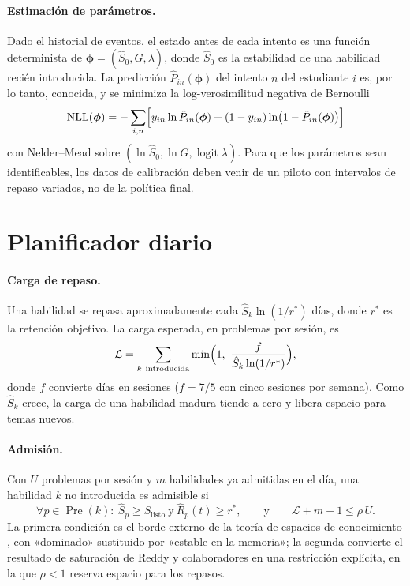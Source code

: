 \documentclass[runningheads]{llncs}
\newcommand{\Pre}{\operatorname{Pre}}
\newcommand{\Rh}{\hat R}
\newcommand{\Sh}{\hat S}
\newcommand{\rstar}{r^{\ast}}
\newcommand{\Slisto}{S_{\mathrm{listo}}}
\newcommand{\Carga}{\mathcal L}
\begin{document}
\paragraph{Estimación de parámetros.} Dado el historial de eventos, el estado antes de cada intento es una función determinista de $\bm\phi=(\Sh_0,G,\lambda)$, donde $\Sh_0$ es la estabilidad de una habilidad recién introducida. La predicción $\hat P_{in}(\bm\phi)$ del intento $n$ del estudiante $i$ es, por lo tanto, conocida, y se minimiza la log-verosimilitud negativa de Bernoulli
\begin{equation}
\mathrm{NLL}(\bm\phi)=-\sum_{i,n}\Bigl[y_{in}\ln\hat P_{in}(\bm\phi)+(1-y_{in})\ln\bigl(1-\hat P_{in}(\bm\phi)\bigr)\Bigr]
\label{eq:nll}
\end{equation}
con Nelder--Mead sobre $(\ln\Sh_0,\ln G,\operatorname{logit}\lambda)$. Para que los parámetros sean identificables, los datos de calibración deben venir de un piloto con intervalos de repaso variados, no de la política final.

\section{Planificador diario}
\label{sec:planificador}

\paragraph{Carga de repaso.} Una habilidad se repasa aproximadamente cada $\Sh_k\ln(1/\rstar)$ días, donde $\rstar$ es la retención objetivo. La carga esperada, en problemas por sesión, es
\begin{equation}
\Carga=\sum_{k\ \text{introducida}}\min\Bigl(1,\ \frac{f}{\Sh_k\ln(1/\rstar)}\Bigr),
\label{eq:carga}
\end{equation}
donde $f$ convierte días en sesiones ($f=7/5$ con cinco sesiones por semana). Como $\Sh_k$ crece, la carga de una habilidad madura tiende a cero y libera espacio para temas nuevos.

\paragraph{Admisión.} Con $U$ problemas por sesión y $m$ habilidades ya admitidas en el día, una habilidad $k$ no introducida es admisible si
\begin{equation}
\forall p\in\Pre(k):\ \Sh_p\ge\Slisto\ \text{y}\ \Rh_p(t)\ge\rstar,
\qquad\text{y}\qquad
\Carga+m+1\le\rho\,U.
\label{eq:admision}
\end{equation}
La primera condición es el borde externo de la teoría de espacios de conocimiento \cite{doignon1985}, con «dominado» sustituido por «estable en la memoria»; la segunda convierte el resultado de saturación de Reddy y colaboradores \cite{reddy2016} en una restricción explícita, en la que $\rho<1$ reserva espacio para los repasos.
\end{document}
